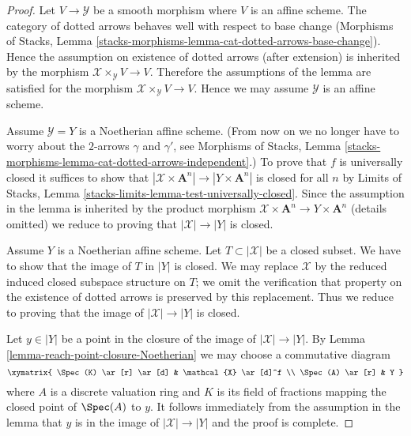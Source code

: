 \begin{proof}
Let $V \to \mathcal{Y}$ be a smooth morphism where $V$ is an affine scheme.
The category of dotted arrows behaves well with respect to base change
(Morphisms of Stacks, Lemma
\ref{stacks-morphisms-lemma-cat-dotted-arrows-base-change}).
Hence the assumption on existence of dotted arrows (after extension)
is inherited by the morphism $\mathcal{X} \times_\mathcal{Y} V \to V$.
Therefore the assumptions of the lemma are satisfied for the morphism
$\mathcal{X} \times_\mathcal{Y} V \to V$.
Hence we may assume $\mathcal{Y}$ is an affine scheme.

\medskip\noindent
Assume $\mathcal{Y} = Y$ is a Noetherian affine scheme.
(From now on we no longer have to worry about the
$2$-arrows $\gamma$ and $\gamma'$, see Morphisms of Stacks, Lemma
\ref{stacks-morphisms-lemma-cat-dotted-arrows-independent}.)
To prove that $f$ is universally closed it suffices to show that
$|\mathcal{X} \times \mathbf{A}^n| \to |Y \times \mathbf{A}^n|$ is closed
for all $n$ by Limits of Stacks, Lemma
\ref{stacks-limits-lemma-test-universally-closed}. Since the assumption
in the lemma is inherited by the product morphism
$\mathcal{X} \times \mathbf{A}^n \to Y \times \mathbf{A}^n$ (details omitted)
we reduce to proving that $|\mathcal{X}| \to |Y|$ is closed.

\medskip\noindent
Assume $Y$ is a Noetherian affine scheme.
Let $T \subset |\mathcal{X}|$ be a closed subset. We have to show that
the image of $T$ in $|Y|$ is closed. We may replace $\mathcal{X}$
by the reduced induced closed subspace structure on $T$; we
omit the verification that property on the existence of
dotted arrows is preserved by this replacement.
Thus we reduce to proving that the image
of $|\mathcal{X}| \to |Y|$ is closed.

\medskip\noindent
Let $y \in |Y|$ be a point in the closure of the image of
$|\mathcal{X}| \to |Y|$. By Lemma \ref{lemma-reach-point-closure-Noetherian}
we may choose a commutative diagram
$$
\xymatrix{
\Spec(K) \ar[r] \ar[d] & \mathcal{X} \ar[d]^f \\
\Spec(A) \ar[r] & Y
}
$$
where $A$ is a discrete valuation ring and $K$ is its field of fractions
mapping the closed point of $\Spec(A)$ to $y$. It follows immediately
from the assumption in the lemma that $y$ is in the image of
$|\mathcal{X}| \to |Y|$ and the proof is complete.
\end{proof}










